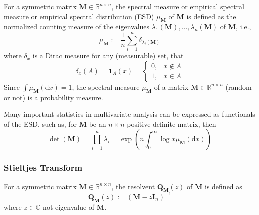 \begin{definition}
    For a symmetric matrix $\mathbf{M}\in\mathbb{R}^{n\times n}$, the spectral measure or empirical spectral measure or empirical spectral distribution (ESD) $\mu_{\mathbf{M}}$ of $\mathbf{M}$ is defined as the normalized counting measure of the eigenvalues $\lambda_{1}(\mathbf{M}),\ldots,\lambda_{n}(\mathbf{M})$ of $\mathbf{M}$, i.e.,
    \begin{equation}
        \mu_{\mathbf{M}}:=\frac{1}{n}\sum_{i=1}^{n}\delta_{\lambda_{i}(\mathbf{M})}
    \end{equation}
    where $\delta_{x}$ is a Dirac measure for any (measurable) set, that
    \begin{equation*}
        \delta_{x}(A)=\mathbf{1}_{A}(x)=
        \begin{cases}
            0, & x\notin A \\
            1, & x\in A
        \end{cases}
    \end{equation*}
    Since $\int\mu_{\mathbf{M}}\left(\mathrm{d}x\right)=1$, the spectral measure $\mu_{\mathbf{M}}$ of a matrix $\mathbf{M}\in\mathbb{R}^{n\times n}$ (random or not) is a probability measure.
\end{definition}

\begin{remark}
    Many important statistics in multivariate analysis can be expressed as functionals of the ESD, such as, for $\mathbf{M}$ be an $n\times n$ positive definite matrix, then
    \begin{equation}
        \operatorname{det}(\mathbf{M})=\prod_{i=1}^{n}\lambda_{i}=\exp\left(n\int_{0}^{\infty}\log x\mu_{\mathbf{M}}(\mathrm{d}x)\right)
    \end{equation}
\end{remark}

\subsubsection{Stieltjes Transform}

\begin{definition}[Resolvent]
    For a symmetric matrix $\mathbf{M}\in\mathbb{R}^{n\times n}$, the resolvent $\mathbf{Q}_{\mathbf{M}}(z)$ of $\mathbf{M}$ is defined as
    \begin{equation}
        \mathbf{Q}_{\mathbf{M}}(z):=\left(\mathbf{M}-z\mathbf{I}_{n}\right)^{-1}
    \end{equation}
    where $z\in\mathbb{C}$ not eigenvalue of $\mathbf{M}$.
\end{definition}

